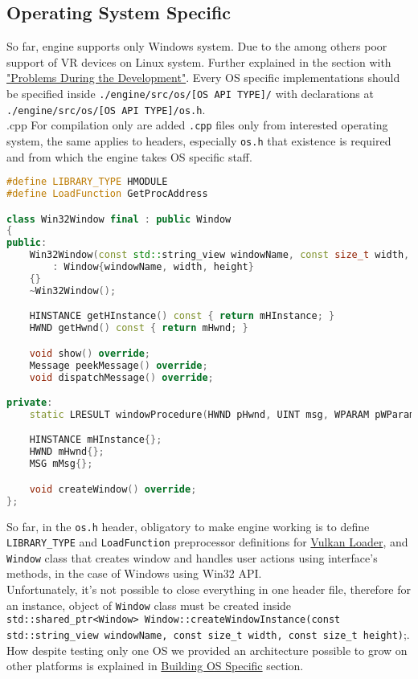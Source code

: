 \newpage
\subsection{Operating System Specific}
\label{sec:os}
So far, engine supports only Windows system. Due to the among others poor support of VR devices on Linux system.
Further explained in the section with \hyperref[sec:problems]{"Problems During the Development"}.
Every OS specific implementations should be specified inside \texttt{./engine/src/os/[OS API TYPE]/} with declarations at \texttt{./engine/src/os/[OS API TYPE]/os.h}.\\.cpp
For compilation only are added \texttt{.cpp} files only from interested operating system, the same applies to headers, especially \texttt{os.h} that existence is required and from which the engine takes OS specific staff.
\begin{lstlisting}[language=c++, caption=Windows OS Header(./engine/src/os/win32/os.h)]
#define LIBRARY_TYPE HMODULE
#define LoadFunction GetProcAddress

class Win32Window final : public Window
{
public:
    Win32Window(const std::string_view windowName, const size_t width, const size_t height)
        : Window{windowName, width, height}
    {}
    ~Win32Window();

    HINSTANCE getHInstance() const { return mHInstance; }
    HWND getHwnd() const { return mHwnd; }

    void show() override;
    Message peekMessage() override;
    void dispatchMessage() override;

private:
    static LRESULT windowProcedure(HWND pHwnd, UINT msg, WPARAM pWParam, LPARAM wLParam);

    HINSTANCE mHInstance{};
    HWND mHwnd{};
    MSG mMsg{};

    void createWindow() override;
};
\end{lstlisting}

So far, in the \texttt{os.h} header, obligatory to make engine working is to define \texttt{LIBRARY\_TYPE} and \texttt{LoadFunction} preprocessor definitions for \hyperref[sec:vkLoader]{Vulkan Loader}, and \texttt{Window} class that creates window and handles user actions using interface's methods, in the case of Windows using Win32 API.\\
Unfortunately, it's not possible to close everything in one header file, therefore for an instance, object of \texttt{Window} class must be created inside \texttt{std::shared\_ptr<Window> Window::createWindowInstance(const std::string\_view windowName, const size\_t width, const size\_t height)};.
How despite testing only one OS we provided an architecture possible to grow on other platforms is explained in
\hyperref[sec:build_specfic]{Building OS Specific} section.
